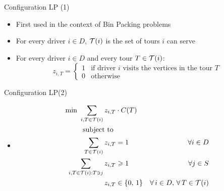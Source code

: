 \begin{frame}[t]{Configuration LP (1)}
    \begin{itemize}
        \item<1-> First used in the context of Bin Packing problems
        \item<2-> For every driver $i \in D$, $\mathcal{T}(i)$ is the set of tours $i$ can serve        
        \item<3-> For every driver $i \in D$ and every tour $T \in \mathcal{T}(i)$:
        \[
            z_{i, T} =
                \begin{cases}
                    1 & \text{if driver $i$ visits the vertices in the tour $T$} \\
                    0 & \text{otherwise}
                \end{cases}
        \]
    \end{itemize}
\end{frame}

\begin{frame}[t]{Configuration LP(2)}
    \label{CLP2}
    \begin{itemize}
        \item<1->[ ] \begin{align}
            \text {min } \label{cg_obj}	 \sum_{ i, 	T \in \mathcal{T}(i) } z_{i, T} & \cdot C(T) &    &  \\
            \text{subject to }             & & \nonumber  \\
            \label{const:cg1}       \sum_{ T \in \mathcal{T}(i) } z_{ i, T } & = 1  &   \forall i \in D \\
            \label{const:cg2}       \sum_{ i, T \in \mathcal{T}(i): T \ni j } z_{ i, T } & \geqslant 1   &   \forall j \in S \\
            \label{consT:cg3}       z_{ i, T } & \in \{0,\, 1\}    & \forall \, i \in D, \, \forall \, T \in \mathcal{T}(i) 
        \end{align}        
    \end{itemize}
\end{frame}

